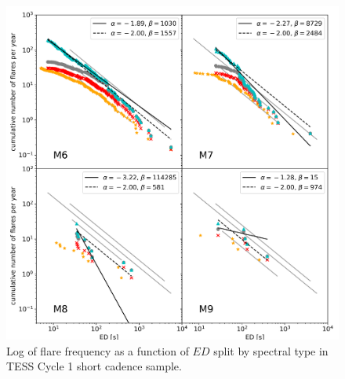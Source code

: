 \documentclass[twocolumn]{aastex62}
\begin{document}
\begin{figure}
	\centering
	\includegraphics[width=1.5\columnwidth]{12_03_2020_14_42_spt_ffds.png}
    \caption{Log of flare frequency as a function of $ED$ split by spectral type in TESS Cycle 1 short cadence sample.}
    \label{fig:ffd_spt_ed}
\end{figure}

\end{document}
